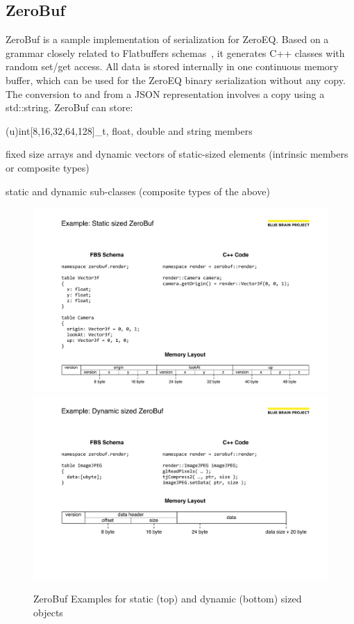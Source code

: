\documentclass[10pt]{llncs}
\begin{document}
\subsection{ZeroBuf}

ZeroBuf is a sample implementation of serialization for ZeroEQ. Based on a
grammar closely related to Flatbuffers schemas~\cite{flatbuffers}, it generates
C++ classes with random \textsf{set/get} access. All data is stored internally
in one continuous memory buffer, which can be used for the ZeroEQ binary
serialization without any copy. The conversion to and from a JSON representation
involves a copy using a \textsf{std::string}. ZeroBuf can store:

\begin{compactitem}
\item (u)int[8,16,32,64,128]\_t, float, double and string members
\item fixed size arrays and dynamic vectors of static-sized elements (intrinsic members or composite types)
\item static and dynamic sub-classes (composite types of the above)
\end{compactitem}

\begin{figure}[ht]\center
  \includegraphics[width=\columnwidth]{images/ZeroBufStatic}\\\vspace{4ex}
  \includegraphics[width=\columnwidth]{images/ZeroBufDynamic}
  \caption{\label{fZeruBuf}ZeroBuf Examples for static (top) and dynamic (bottom) sized objects}
\end{figure}
\end{document}
